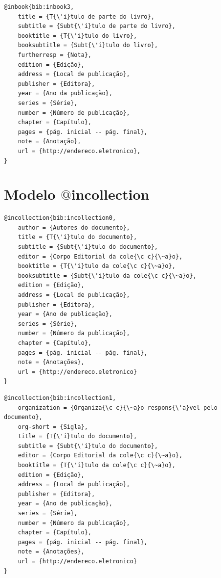 \documentclass[a4paper,12pt,oneside,onecolumn,final,fleqn]{repUERJ}
\begin{document}
\begin{verbatim}
@inbook{bib:inbook3,
    title = {T{\'i}tulo de parte do livro},
    subtitle = {Subt{\'i}tulo de parte do livro},
    booktitle = {T{\'i}tulo do livro},
    booksubtitle = {Subt{\'i}tulo do livro},
    furtherresp = {Nota},
    edition = {Edição},
    address = {Local de publicação},
    publisher = {Editora},
    year = {Ano da publicação},
    series = {Série},
    number = {Número de publicação},
    chapter = {Capítulo},
    pages = {pág. inicial -- pág. final},
    note = {Anotação},
    url = {http://endereco.eletronico},
}
\end{verbatim}

\section{Modelo $@$incollection}

\noindent{}

\begin{verbatim}
@incollection{bib:incollection0,
    author = {Autores do documento},
    title = {T{\'i}tulo do documento},
    subtitle = {Subt{\'i}tulo do documento},
    editor = {Corpo Editorial da cole{\c c}{\~a}o},
    booktitle = {T{\'i}tulo da cole{\c c}{\~a}o},
    booksubtitle = {Subt{\'i}tulo da cole{\c c}{\~a}o},
    edition = {Edição},
    address = {Local de publicação},
    publisher = {Editora},
    year = {Ano de publicação},
    series = {Série},
    number = {Número da publicação},
    chapter = {Capítulo},
    pages = {pág. inicial -- pág. final},
    note = {Anotações},
    url = {http://endereco.eletronico}
}
\end{verbatim}

\noindent{}

\begin{verbatim}
@incollection{bib:incollection1,
    organization = {Organiza{\c c}{\~a}o respons{\'a}vel pelo documento},
    org-short = {Sigla},
    title = {T{\'i}tulo do documento},
    subtitle = {Subt{\'i}tulo do documento},
    editor = {Corpo Editorial da cole{\c c}{\~a}o},
    booktitle = {T{\'i}tulo da cole{\c c}{\~a}o},
    edition = {Edição},
    address = {Local de publicação},
    publisher = {Editora},
    year = {Ano de publicação},
    series = {Série},
    number = {Número da publicação},
    chapter = {Capítulo},
    pages = {pág. inicial -- pág. final},
    note = {Anotações},
    url = {http://endereco.eletronico}
}
\end{verbatim}
\end{document}
